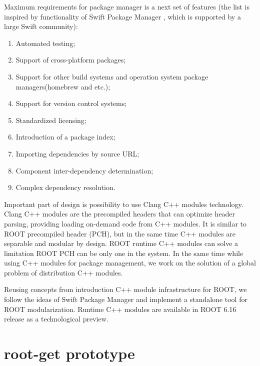 \documentclass{webofc}
\begin{document}
Maximum requirements for package manager is a next set of features (the list is inspired by functionality of Swift Package Manager \cite{swift}, which is supported by a large Swift community):
\begin{enumerate}
\item Automated testing; 
\item Support of cross-platform packages;
\item Support for other build systems  and operation system package managers(homebrew and etc.);
\item Support for version control systems;
\item Standardized licensing;
\item Introduction of a package index;
\item Importing dependencies by source URL;
\item Component inter-dependency determination;
\item Complex dependency resolution.
\end{enumerate}

Important part of design is possibility to use Clang C++ modules technology. Clang C++ modules are the precompiled headers that can optimize header parsing, providing loading on-demand code from C++ modules. It is similar to ROOT precompiled header (PCH), but in the same time C++ modules are separable and modular by design. ROOT runtime C++ modules can solve a limitation ROOT PCH can be only one in the system. In the same time while using C++ modules for package management, we work on the solution of a global problem of distribution C++ modules.

Reusing concepts from introduction C++ module infrastructure for ROOT, we follow the ideas of Swift Package Manager \cite{swiftpm} and implement a standalone tool for ROOT modularization. Runtime C++ modules are available in ROOT 6.16 release as a technological preview.

\section{root-get prototype}
\end{document}
